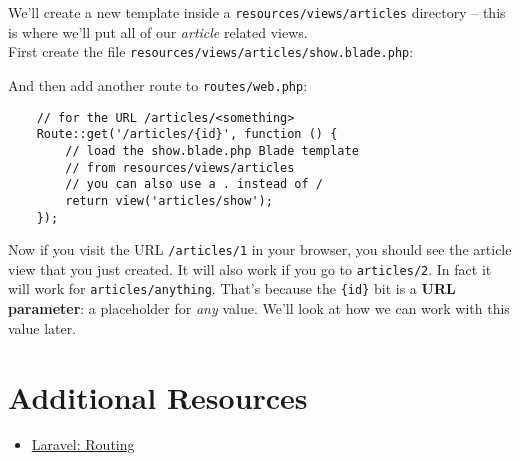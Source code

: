 We'll create a new template inside a \texttt{resources/views/articles} directory – this is where we'll put all of our \textit{article} related views.
\\

First create the file \texttt{resources/views/articles/show.blade.php}:


And then add another route to \texttt{routes/web.php}:

\begin{verbatim}
    // for the URL /articles/<something>
    Route::get('/articles/{id}', function () {
        // load the show.blade.php Blade template
        // from resources/views/articles
        // you can also use a . instead of /
        return view('articles/show');
    });
\end{verbatim}

Now if you visit the URL \texttt{/articles/1} in your browser, you should see the article view that you just created. It will also work if you go to \texttt{articles/2}. In fact it will work for \texttt{articles/anything}. That's because the \texttt{\{id\}} bit is a \textbf{URL parameter}: a placeholder for \textit{any} value. We'll look at how we can work with this value later.

\section{Additional Resources}

\begin{itemize}[leftmargin=*]
    \item \href{http://laravel.com/docs/master/routing}{Laravel: Routing}
\end{itemize}
